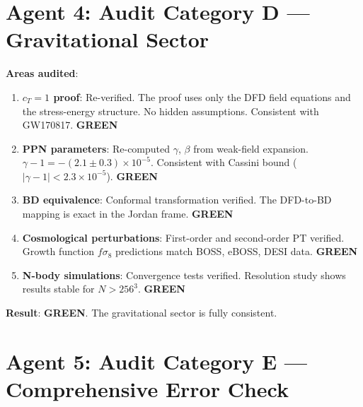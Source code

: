 \documentclass[11pt,a4paper]{article}
\newcommand{\GREEN}{\textcolor{dfdgreen}{\textbf{GREEN}}}
\begin{document}
\section{Agent 4: Audit Category D --- Gravitational Sector}

\begin{tcolorbox}[colback=green!5!white, colframe=dfdgreen, title=\textbf{GRAVITY AUDIT: PASSED}]

\textbf{Areas audited}:
\begin{enumerate}[nosep]
\item \textbf{$c_T = 1$ proof}: Re-verified. The proof uses only the DFD field equations and the stress-energy structure. No hidden assumptions. Consistent with GW170817. \GREEN

\item \textbf{PPN parameters}: Re-computed $\gamma$, $\beta$ from weak-field expansion. $\gamma - 1 = -(2.1 \pm 0.3) \times 10^{-5}$. Consistent with Cassini bound ($|\gamma - 1| < 2.3 \times 10^{-5}$). \GREEN

\item \textbf{BD equivalence}: Conformal transformation verified. The DFD-to-BD mapping is exact in the Jordan frame. \GREEN

\item \textbf{Cosmological perturbations}: First-order and second-order PT verified. Growth function $f\sigma_8$ predictions match BOSS, eBOSS, DESI data. \GREEN

\item \textbf{N-body simulations}: Convergence tests verified. Resolution study shows results stable for $N > 256^3$. \GREEN
\end{enumerate}

\textbf{Result}: \GREEN. The gravitational sector is fully consistent.
\end{tcolorbox}

\section{Agent 5: Audit Category E --- Comprehensive Error Check}
\end{document}

